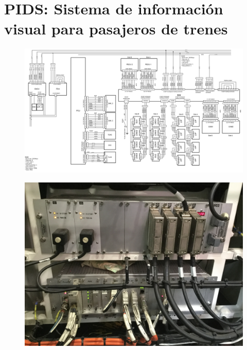 \pagebreak
\section{PIDS: Sistema de información visual para pasajeros de trenes}

\begin{figure}[ht]
	\centering
	\includegraphics[width=1\textwidth , angle=90]{./Figures/diagramaPIDS.png}
	\caption{}
	\label{fig:diagramaPIDS}
\end{figure}


\begin{figure}[ht]
	\centering
	\includegraphics[width=1\textwidth]{./Figures/rackPIDS1.JPG}
	\caption{}
	\label{fig:rackPIDS1}
\end{figure}



